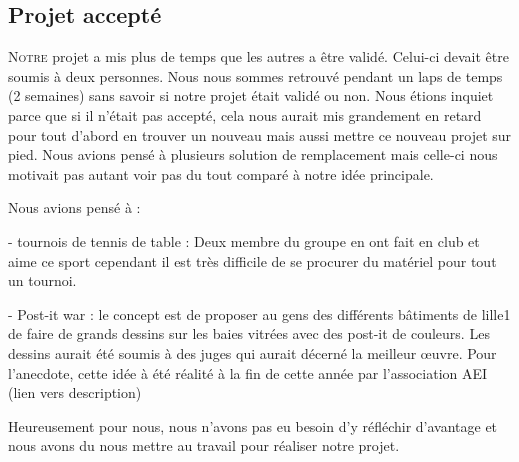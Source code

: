 \subsection{Projet accepté}%
\label{sub:projet_accepte}

\lettrine{N}{otre} projet a mis plus de temps que les autres a être
validé.  Celui-ci devait être soumis à deux personnes. Nous nous sommes
retrouvé pendant un laps de temps (2 semaines) sans savoir si notre
projet était validé ou non. Nous étions inquiet parce que si il n'était
pas accepté, cela nous aurait mis grandement en retard pour tout d'abord
en trouver un nouveau mais aussi mettre ce nouveau projet sur pied. Nous
avions pensé à plusieurs solution de remplacement mais celle-ci nous
motivait pas autant voir pas du tout comparé à notre idée principale.

Nous avions pensé à :

- tournois de tennis de table : Deux membre du groupe en ont fait en
club et aime ce sport cependant il est très difficile de se procurer du
matériel pour tout un tournoi.

- Post-it war : le concept est de proposer au gens des différents
bâtiments de lille1 de faire de grands dessins sur les baies vitrées
avec des post-it de couleurs. Les dessins aurait été soumis à des juges
qui aurait décerné la meilleur \oe{}uvre.  Pour l'anecdote, cette idée à
été réalité à la fin de cette année par l'association AEI (lien vers
description)

Heureusement pour nous, nous n'avons pas eu besoin d'y réfléchir
d'avantage et nous avons du nous mettre au travail pour réaliser notre
projet.

